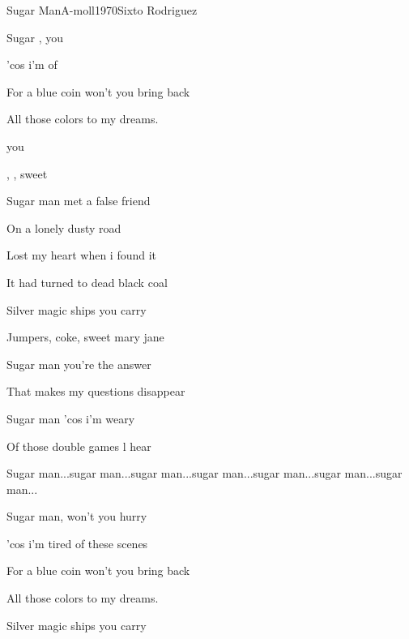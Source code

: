 \documentclass[a4paper,draft]{book}
\begin{document}
\begin{song}{Sugar Man}{A-moll}{1970}{Sixto Rodriguez}{}{}

\begin{SBVerse}
	Sugar ,  you  

	'cos i'm  of  

	For a blue coin won't you bring back

	All those colors to my dreams.
\end{SBVerse}

\begin{SBChorus}
	   you 

	, , sweet   
\end{SBChorus}

\begin{SBVerse}
	Sugar man met a false friend

	On a lonely dusty road

	Lost my heart when i found it

	It had turned to dead black coal
\end{SBVerse}

\begin{SBChorus}
	Silver magic ships you carry

	Jumpers, coke, sweet mary jane
\end{SBChorus}

\begin{SBVerse}
	Sugar man you're the answer

	That makes my questions disappear

	Sugar man 'cos i'm weary

	Of those double games l hear
\end{SBVerse}

	Sugar man...sugar man...sugar man...sugar man...sugar man...sugar man...sugar man...

\begin{SBVerse}
	Sugar man, won't you hurry

	'cos i'm tired of these scenes

	For a blue coin won't you bring back

	All those colors to my dreams.
\end{SBVerse}

\begin{SBChorus}
	Silver magic ships you carry


\end{SBChorus}
\end{song}
\end{document}
